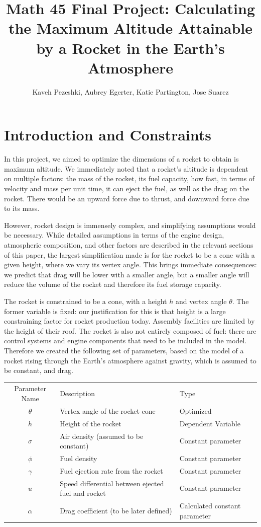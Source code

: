 \documentclass[]{article}
\title{Math 45 Final Project: Calculating the Maximum Altitude Attainable by a Rocket in the Earth's Atmosphere}
\author{Kaveh Pezeshki, Aubrey Egerter, Katie Partington, Jose Suarez}
\begin{document}
\maketitle

\section{Introduction and Constraints}

In this project, we aimed to optimize the dimensions of a rocket to obtain is maximum altitude. We immediately noted that a rocket's altitude is dependent on multiple factors: the mass of the rocket, its fuel capacity, how fast, in terms of velocity and mass per unit time, it can eject the fuel, as well as the drag on the rocket. There would be an upward force due to thrust, and downward force due to its mass.

However, rocket design is immensely complex, and simplifying assumptions would be necessary. While detailed assumptions in terms of the engine design, atmospheric composition, and other factors are described in the relevant sections of this paper, the largest simplification made is for the rocket to be a cone with a given height, where we vary its vertex angle. This brings immediate consequences: we predict that drag will be lower with a smaller angle, but a smaller angle will reduce the volume of the rocket and therefore its fuel storage capacity.

The rocket is constrained to be a cone, with a  height $h$ and vertex angle $\theta$. The former variable is fixed: our justification for this is that height is a large constraining factor for rocket production today. Assembly facilities are limited by the height of their roof. The rocket is also not entirely composed of fuel: there are control systems and engine components that need to be included in the model. Therefore we created the following set of parameters, based on the model of a rocket rising through the Earth's atmosphere against gravity, which is assumed to be constant, and drag.

\begin{center}
	\begin{tabular} {c l l}
		Parameter Name & Description & Type \\
		$\theta$ & Vertex angle of the rocket cone & Optimized\\
		$h$ & Height of the rocket & Dependent Variable\\
		$\sigma$ & Air density (assumed to be constant) & Constant parameter\\
		$\phi$ & Fuel density & Constant parameter\\
		$\gamma$ & Fuel ejection rate from the rocket & Constant parameter\\
		$u$ & Speed differential between ejected fuel and rocket & Constant parameter\\
		$\alpha$ & Drag coefficient (to be later defined) & Calculated constant parameter
	\end{tabular}
\end{center}
\end{document}
